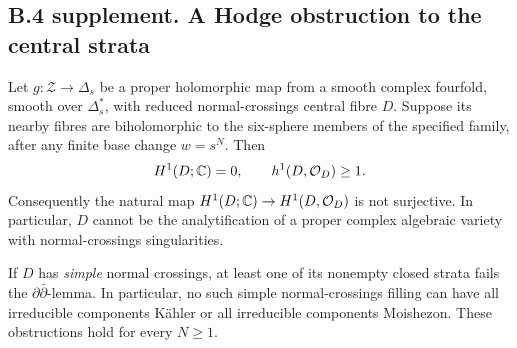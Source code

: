 \subsection{B.4 supplement. A Hodge obstruction to the central strata}

\begin{theorem}
Let $g:\mathcal Z\to\Delta_s$ be a proper holomorphic map from a
smooth complex fourfold, smooth over $\Delta_s^*$, with reduced
normal-crossings central fibre $D$. Suppose its nearby fibres are
biholomorphic to the six-sphere members of the specified family,
after any finite base change $w=s^N$. Then
\[
 H^1(D;\mathbb C)=0,\qquad h^1(D,\mathcal O_D)\geq1.
\]
Consequently the natural map
$H^1(D;\mathbb C)\to H^1(D,\mathcal O_D)$ is not surjective. In particular,
$D$ cannot be the analytification of a proper complex algebraic
variety with normal-crossings singularities.

If $D$ has \emph{simple} normal crossings, at least one of its
nonempty closed strata fails the $\partial\bar\partial$-lemma.
In particular, no such simple normal-crossings filling can have
all irreducible components K\"ahler or all irreducible components
Moishezon. These obstructions hold for every $N\geq1$.
\end{theorem}
